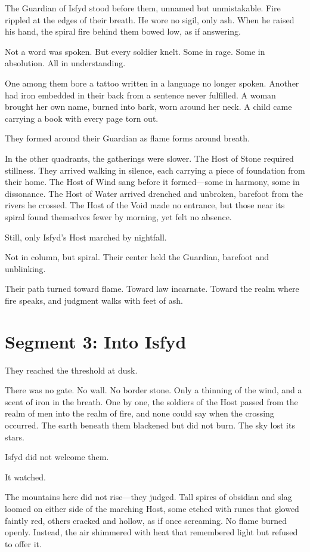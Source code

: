 \documentclass[9pt]{article}
\begin{document}
The Guardian of Isfyd stood before them, unnamed but unmistakable. Fire rippled at the edges of their breath. He wore no sigil, only ash. When he raised his hand, the spiral fire behind them bowed low, as if answering.

Not a word was spoken. But every soldier knelt. Some in rage. Some in absolution. All in understanding.

One among them bore a tattoo written in a language no longer spoken. Another had iron embedded in their back from a sentence never fulfilled. A woman brought her own name, burned into bark, worn around her neck. A child came carrying a book with every page torn out.

They formed around their Guardian as flame forms around breath.

In the other quadrants, the gatherings were slower. The Host of Stone required stillness. They arrived walking in silence, each carrying a piece of foundation from their home. The Host of Wind sang before it formed—some in harmony, some in dissonance. The Host of Water arrived drenched and unbroken, barefoot from the rivers he crossed. The Host of the Void made no entrance, but those near its spiral found themselves fewer by morning, yet felt no absence.

Still, only Isfyd’s Host marched by nightfall.

Not in column, but spiral. Their center held the Guardian, barefoot and unblinking.

Their path turned toward flame. Toward law incarnate. Toward the realm where fire speaks, and judgment walks with feet of ash.

\newpage

\section*{Segment 3: Into Isfyd}

They reached the threshold at dusk.

There was no gate. No wall. No border stone. Only a thinning of the wind, and a scent of iron in the breath. One by one, the soldiers of the Host passed from the realm of men into the realm of fire, and none could say when the crossing occurred. The earth beneath them blackened but did not burn. The sky lost its stars.

Isfyd did not welcome them.

It watched.

The mountains here did not rise—they judged. Tall spires of obsidian and slag loomed on either side of the marching Host, some etched with runes that glowed faintly red, others cracked and hollow, as if once screaming. No flame burned openly. Instead, the air shimmered with heat that remembered light but refused to offer it.
\end{document}
